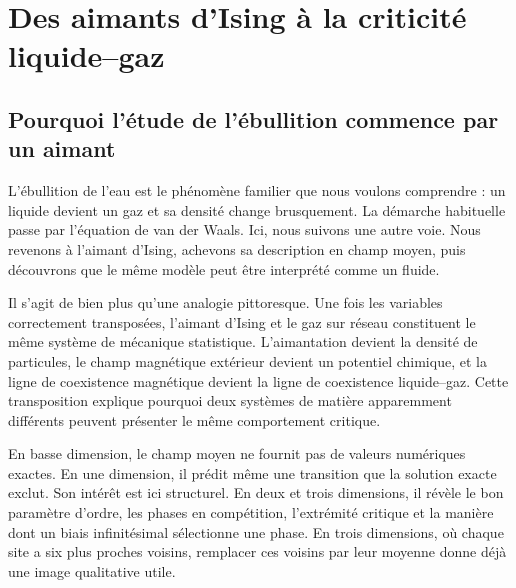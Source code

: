 \chapter{Des aimants d’Ising à la criticité liquide--gaz}


\section{Pourquoi l’étude de l’ébullition commence par un aimant}

L’ébullition de l’eau est le phénomène familier que nous voulons comprendre : un liquide devient un gaz et sa densité change brusquement. La démarche habituelle passe par l’équation de van der Waals. Ici, nous suivons une autre voie. Nous revenons à l’aimant d’Ising, achevons sa description en champ moyen, puis découvrons que le même modèle peut être interprété comme un fluide.

Il s’agit de bien plus qu’une analogie pittoresque. Une fois les variables correctement transposées, l’aimant d’Ising et le gaz sur réseau constituent le même système de mécanique statistique. L’aimantation devient la densité de particules, le champ magnétique extérieur devient un potentiel chimique, et la ligne de coexistence magnétique devient la ligne de coexistence liquide--gaz. Cette transposition explique pourquoi deux systèmes de matière apparemment différents peuvent présenter le même comportement critique.

En basse dimension, le champ moyen ne fournit pas de valeurs numériques exactes. En une dimension, il prédit même une transition que la solution exacte exclut. Son intérêt est ici structurel. En deux et trois dimensions, il révèle le bon paramètre d’ordre, les phases en compétition, l’extrémité critique et la manière dont un biais infinitésimal sélectionne une phase. En trois dimensions, où chaque site a six plus proches voisins, remplacer ces voisins par leur moyenne donne déjà une image qualitative utile.

